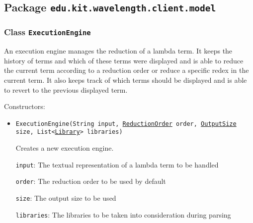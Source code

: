 \subsection{Package \lstinline{edu.kit.wavelength.client.model}}
\label{pkg:edu.kit.wavelength.client.model}


\subsubsection{Class \texttt{ExecutionEngine}}
\label{type:edu.kit.wavelength.client.model.ExecutionEngine}
An execution engine manages the reduction of a lambda term.
 It keeps the history of terms and which of these terms were
 displayed and is able to reduce the current term according
 to a reduction order or reduce a specific redex in the current
 term. It also keeps track of which terms should be displayed and
 is able to revert to the previous displayed term.

Constructors:
\begin{itemize}
\item \texttt{ExecutionEngine(String input, \hyperref[type:edu.kit.wavelength.client.model.reduction.ReductionOrder]{ReductionOrder} order, \hyperref[type:edu.kit.wavelength.client.model.output.OutputSize]{OutputSize} size, List<\hyperref[type:edu.kit.wavelength.client.model.library.Library]{Library}> libraries)}

Creates a new execution engine.

\texttt{input}: The textual representation of a lambda term to be handled

\texttt{order}: The reduction order to be used by default

\texttt{size}: The output size to be used

\texttt{libraries}: The libraries to be taken into consideration during parsing

\end{itemize}

